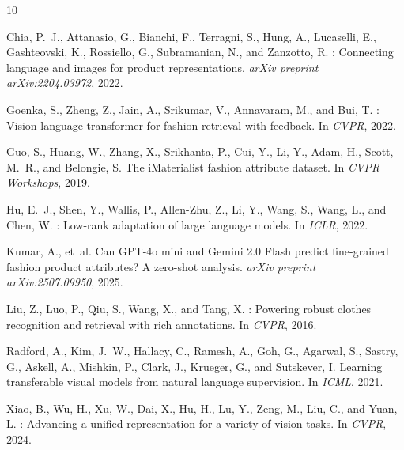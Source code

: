 \documentclass[10pt,twocolumn]{article}
\begin{document}

\begin{thebibliography}{10}

Chia, P.~J., Attanasio, G., Bianchi, F., Terragni, S., Hung, A.,
Lucaselli, E., Gashteovski, K., Rossiello, G., Subramanian, N., and
Zanzotto, R.
: Connecting language and images for product
representations.
\newblock \emph{arXiv preprint arXiv:2204.03972}, 2022.

Goenka, S., Zheng, Z., Jain, A., Srikumar, V., Annavaram, M., and Bui, T.
: Vision language transformer for fashion retrieval with
feedback.
\newblock In \emph{CVPR}, 2022.

Guo, S., Huang, W., Zhang, X., Srikhanta, P., Cui, Y., Li, Y., Adam, H.,
Scott, M.~R., and Belongie, S.
\newblock The {iMaterialist} fashion attribute dataset.
\newblock In \emph{CVPR Workshops}, 2019.

Hu, E.~J., Shen, Y., Wallis, P., Allen-Zhu, Z., Li, Y., Wang, S., Wang,
L., and Chen, W.
: Low-rank adaptation of large language models.
\newblock In \emph{ICLR}, 2022.

Kumar, A., et~al.
\newblock Can {GPT-4o} mini and {Gemini 2.0 Flash} predict fine-grained fashion
product attributes? {A} zero-shot analysis.
\newblock \emph{arXiv preprint arXiv:2507.09950}, 2025.

Liu, Z., Luo, P., Qiu, S., Wang, X., and Tang, X.
: Powering robust clothes recognition and retrieval
with rich annotations.
\newblock In \emph{CVPR}, 2016.

Radford, A., Kim, J.~W., Hallacy, C., Ramesh, A., Goh, G., Agarwal, S.,
Sastry, G., Askell, A., Mishkin, P., Clark, J., Krueger, G., and
Sutskever, I.
\newblock Learning transferable visual models from natural language
supervision.
\newblock In \emph{ICML}, 2021.

Xiao, B., Wu, H., Xu, W., Dai, X., Hu, H., Lu, Y., Zeng, M., Liu, C.,
and Yuan, L.
: Advancing a unified representation for a variety of
vision tasks.
\newblock In \emph{CVPR}, 2024.

\end{thebibliography}
\end{document}
